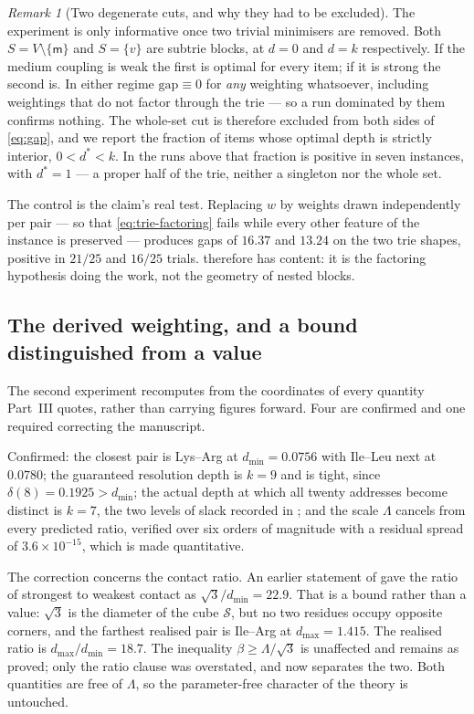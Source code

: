 \documentclass[11pt,twocolumn,a4paper]{article}
\theoremstyle{thmstyle}
\theoremstyle{definition}
\theoremstyle{remark}
\newtheorem{remark}[theorem]{Remark}
\newcommand{\V}{V}
\newcommand{\wt}{w}
\newcommand{\med}{\mathsf{m}}
\newcommand{\flo}{\beta}
\newcommand{\gapv}{\mathrm{gap}}
\newcommand{\Sspace}{\mathcal{S}}
\begin{document}
\begin{remark}[Two degenerate cuts, and why they had to be excluded]
\label{rem:degenerate-cuts}
The experiment is only informative once two trivial minimisers are
removed. Both $S = \V \setminus \{\med\}$ and $S = \{v\}$ are subtrie
blocks, at $d=0$ and $d=k$ respectively. If the medium coupling is weak
the first is optimal for every item; if it is strong the second is. In
either regime $\gapv \equiv 0$ for \emph{any} weighting whatsoever,
including weightings that do not factor through the trie --- so a run
dominated by them confirms nothing. The whole-set cut is therefore
excluded from both sides of \eqref{eq:gap}, and we report the fraction
of items whose optimal depth is strictly interior, $0 < d^{*} < k$. In
the runs above that fraction is positive in seven instances, with
$d^{*}=1$ --- a proper half of the trie, neither a singleton nor the
whole set.
\end{remark}

The control is the claim's real test. Replacing $\wt$ by weights drawn
independently per pair --- so that \eqref{eq:trie-factoring} fails while
every other feature of the instance is preserved --- produces gaps of
$16.37$ and $13.24$ on the two trie shapes, positive in $21/25$ and
$16/25$ trials.  therefore has content: it is the
factoring hypothesis doing the work, not the geometry of nested blocks.

\subsection{The derived weighting, and a bound distinguished from a value}
\label{sec:val-b}

The second experiment recomputes from the coordinates of 
every quantity Part~III quotes, rather than carrying figures forward.
Four are confirmed and one required correcting the manuscript.

Confirmed: the closest pair is Lys--Arg at $d_{\min} = 0.0756$ with
Ile--Leu next at $0.0780$; the guaranteed resolution depth is $k=9$ and
is tight, since $\delta(8) = 0.1925 > d_{\min}$; the actual depth at
which all twenty addresses become distinct is $k=7$, the two levels of
slack recorded in ; and the scale $\Lambda$
cancels from every predicted ratio, verified over six orders of
magnitude with a residual spread of $3.6\times10^{-15}$, which is
 made quantitative.

The correction concerns the contact ratio. An earlier statement of
 gave the ratio of strongest to weakest
contact as $\sqrt3/d_{\min} = 22.9$. That is a bound rather than a
value: $\sqrt3$ is the diameter of the cube $\Sspace$, but no two
residues occupy opposite corners, and the farthest realised pair is
Ile--Arg at $d_{\max} = 1.415$. The realised ratio is
$d_{\max}/d_{\min} = 18.7$. The inequality $\flo \geq \Lambda/\sqrt3$ is
unaffected and remains as proved; only the ratio clause was overstated,
and  now separates the two. Both quantities are
free of $\Lambda$, so the parameter-free character of the theory is
untouched.
\end{document}
